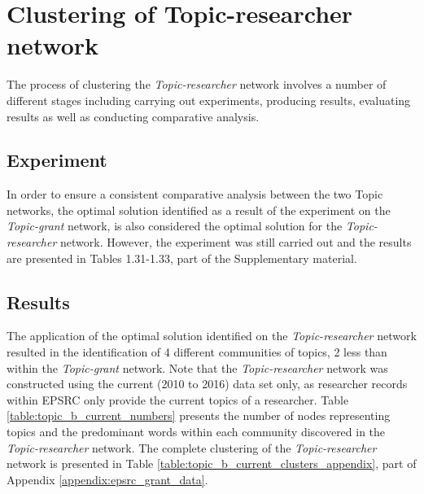 \clearpage

\section{Clustering of Topic-researcher network}

The process of clustering the \textit{Topic-researcher} network involves a number of different stages including carrying out experiments, producing results, evaluating results as well as conducting comparative analysis.

\subsection{Experiment}

In order to ensure a consistent comparative analysis between the two Topic networks, the optimal solution identified as a result of the experiment on the \textit{Topic-grant} network, is also considered the optimal solution for the \textit{Topic-researcher} network. However, the experiment was still carried out and the results are presented in Tables 1.31-1.33, part of the Supplementary material.

\subsection{Results}

The application of the optimal solution identified on the \textit{Topic-researcher} network resulted in the identification of 4 different communities of topics, 2 less than within the \textit{Topic-grant} network. Note that the \textit{Topic-researcher} network was constructed using the current (2010 to 2016) data set only, as researcher records within EPSRC only provide the current topics of a researcher. Table \ref{table:topic_b_current_numbers} presents the number of nodes representing topics and the predominant words within each community discovered in the \textit{Topic-researcher} network. The complete clustering of the \textit{Topic-researcher} network is presented in Table \ref{table:topic_b_current_clusters_appendix}, part of Appendix \ref{appendix:epsrc_grant_data}.


